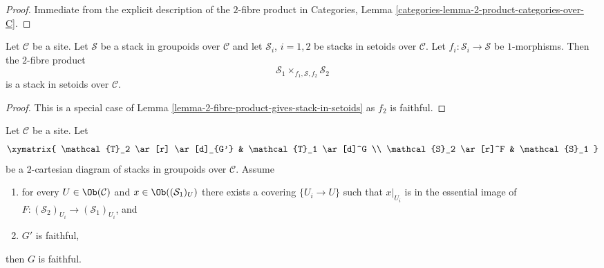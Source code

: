 \begin{proof}
Immediate from the explicit description of the $2$-fibre product in
Categories, Lemma \ref{categories-lemma-2-product-categories-over-C}.
\end{proof}

\begin{lemma}
\label{lemma-2-fibre-product-stacks-in-setoids-over-stack-in-groupoids}
Let $\mathcal{C}$ be a site.
Let $\mathcal{S}$ be a stack in groupoids over $\mathcal{C}$ and
let $\mathcal{S}_i$, $i = 1, 2$ be stacks in setoids over $\mathcal{C}$.
Let $f_i : \mathcal{S}_i \to \mathcal{S}$ be $1$-morphisms.
Then the $2$-fibre product
$$
\mathcal{S}_1 \times_{f_1, \mathcal{S}, f_2} \mathcal{S}_2
$$
is a stack in setoids over $\mathcal{C}$.
\end{lemma}

\begin{proof}
This is a special case of
Lemma \ref{lemma-2-fibre-product-gives-stack-in-setoids}
as $f_2$ is faithful.
\end{proof}

\begin{lemma}
\label{lemma-faithful-descent}
Let $\mathcal{C}$ be a site. Let
$$
\xymatrix{
\mathcal{T}_2 \ar[r] \ar[d]_{G'} & \mathcal{T}_1 \ar[d]^G \\
\mathcal{S}_2 \ar[r]^F & \mathcal{S}_1
}
$$
be a $2$-cartesian diagram of stacks in groupoids over $\mathcal{C}$.
Assume
\begin{enumerate}
\item for every $U \in \Ob(\mathcal{C})$ and
$x \in \Ob((\mathcal{S}_1)_U)$ there exists a covering
$\{U_i \to U\}$ such that $x|_{U_i}$ is in the essential
image of $F : (\mathcal{S}_2)_{U_i} \to (\mathcal{S}_1)_{U_i}$, and
\item $G'$ is faithful,
\end{enumerate}
then $G$ is faithful.
\end{lemma}

